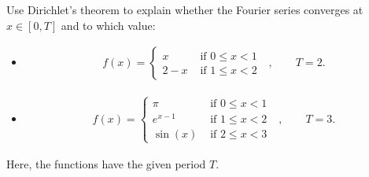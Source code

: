 \documentclass[11pt]{article}
\begin{document}

\begin{exercise}
    Use Dirichlet's theorem to explain whether the Fourier series converges at $x \in [0,T]$ and to which value:
    \begin{itemize}
     \item \begin{gather*}
            f(x) = \left\{\begin{array}{ll}
                            x   & \text{ if $0 \leq x < 1$ }
                            \\
                            2 - x & \text{ if $1 \leq x < 2$ }
                          \end{array}\right., \qquad T = 2.
           \end{gather*}
     \item \begin{gather*}
            f(x) = \left\{\begin{array}{ll}
                            \pi   & \text{ if $0 \leq x < 1$ }
                            \\
                            e^{x-1} & \text{ if $1 \leq x < 2$ }
                            \\
                            \sin(x) & \text{ if $2 \leq x < 3$ }
                          \end{array}\right., \qquad T = 3.
           \end{gather*}
    \end{itemize}
    Here, the functions have the given period $T$.
\end{exercise}
\end{document}
